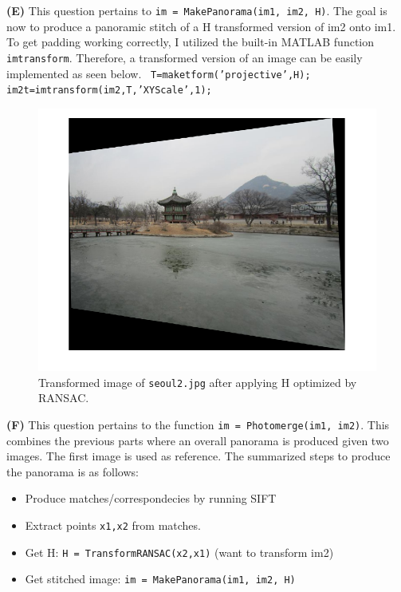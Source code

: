 \documentclass[12pt,twoside]{article}
\begin{document}
\textbf{(E)} This question pertains to \texttt{im = MakePanorama(im1, im2, H)}.  The goal is now to produce a panoramic stitch of a H transformed version of im2 onto im1.  To get padding working correctly, I utilized the built-in MATLAB function \texttt{imtransform}.  Therefore, a transformed version of an image can be easily implemented as seen below.\newline\newline
\texttt{
T=maketform('projective',H);\newline
im2t=imtransform(im2,T,'XYScale',1); %
}
\newline

\begin{figure}[h]
  \begin{center}
    \includegraphics[width=.65\linewidth, trim= 0pt 20pt 0pt 20pt, clip]{im2t.png}

  \end{center}
  \caption{Transformed image of \texttt{seoul2.jpg} after applying H optimized by RANSAC. }
  \label{fig:pipeline}
\end{figure}

\textbf{(F)} This question pertains to the function \texttt{im = Photomerge(im1, im2)}. This combines the previous parts where an overall panorama is produced given two images.  The first image is used as reference.  The summarized steps to produce the panorama is as follows:

\begin{itemize}
  \item Produce matches/correspondecies by running SIFT
  \item Extract points \texttt{x1,x2} from matches.
  \item Get H: \texttt{H = TransformRANSAC(x2,x1)} (want to transform im2)
  \item Get stitched image: \texttt{im = MakePanorama(im1, im2, H)} 
\end{itemize}
\end{document}
